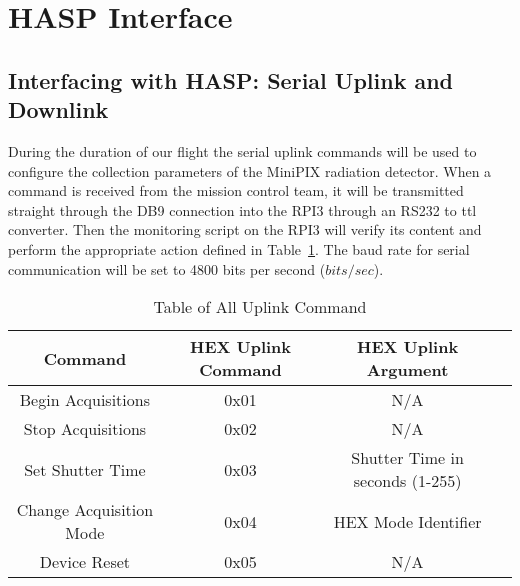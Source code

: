 \section{HASP Interface}
\label{sec:Hasp-Interface}

\subsection{Interfacing with HASP: Serial Uplink and Downlink}
During the duration of our flight the serial uplink commands will be used to configure the collection parameters of the MiniPIX radiation detector. When a command is received from the mission control team, it will be transmitted straight through the DB9 connection into the RPI3 through an RS232 to ttl converter. Then the monitoring script on the RPI3 will verify its content and perform the appropriate action defined in Table~\ref{tab:All-Commands}. The baud rate for serial communication will be set to 4800 bits per second ($bits/sec$). 


\begin{table}[!ht]
\centering
\caption{Table of All Uplink Command} 
\label{tab:All-Commands}
\bigskip
\begin{tabular}{|c|c|c|c|}
\hline
\multicolumn{1}{|c|}{\bfseries Command} & \multicolumn{1}{c|}{\bfseries HEX Uplink Command} & \multicolumn{1}{c|}{\bfseries HEX Uplink Argument}\\
\hline
    Begin Acquisitions 		& 0x01	 & N/A			    	    \\ \hline 
    Stop Acquisitions 		& 0x02	 & N/A			            \\ \hline
    Set Shutter Time		& 0x03   & Shutter Time in seconds (1-255)  \\ \hline %
    Change Acquisition Mode    	& 0x04 	 & HEX Mode Identifier 	            \\ \hline
    Device Reset		& 0x05 	 & N/A				    \\ \hline
    
\end{tabular}
\medskip
\end{table}

